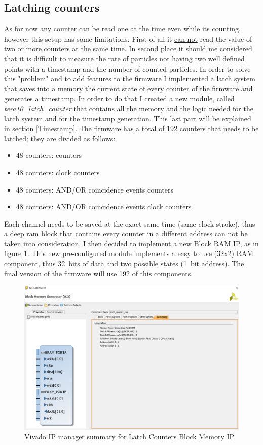 \subsection{Latching counters}\label{Latch}
\noindent As for now any counter can be read one at the time even while its counting, however this setup has some limitations. First of all it \underline{can not} read the value of two or more counters at the same time.
In second place it should me considered that it is difficult to measure the rate of particles not having two well defined points with a timestamp and the number of counted particles.
In order to solve this "problem" and to add features to the firmware I implemented a latch system that saves into a memory the current state of every counter of the firmware and generates a timestamp.
In order to do that I created a new module, called \textit{tera10\_latch\_counter} that contains all the memory and the logic needed for the latch system and for the timestamp generation. This last part will be explained in section \ref{Timestamp}.
The firmware has a total of 192 counters that needs to be latched; they are divided as follows:
\begin{itemize}
	\item 48 counters: counters
	\item 48 counters: clock counters
	\item 48 counters: AND/OR coincidence events counters
	\item 48 counters: AND/OR coincidence events clock counters
\end{itemize}
\noindent Each channel needs to be saved at the exact same time (same clock stroke), thus a deep ram block that contains every counter in a different address can not be taken into consideration.
I then decided to implement a new Block RAM IP, as in figure \ref{fig:ramip}. This new pre-configured module implements a easy to use (32x2) RAM component, thus 32~bits of data and two possible states (1~bit address). The final version of the firmware will use 192 of this components. 
\begin{figure}[H]
	\centering
	\includegraphics[width=0.6\linewidth]{IMG/ch4/LATCH_RAM_IP}
	\caption{Vivado IP manager summary for Latch Counters Block Memory IP}
	\label{fig:ramip}
\end{figure}
